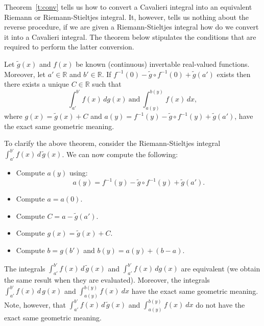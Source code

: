 \documentclass[twoside,reqno,11pt]{fcaa-var} %
\begin{document}
Theorem~\ref{t:conv} tells us how to convert a Cavalieri integral into an equivalent Riemann or Riemann-Stieltjes integral. It, however, tells us nothing about the reverse 
procedure, if we are given a Riemann-Stieltjes integral how do we convert it into a Cavalieri integral. The theorem below stipulates the conditions that are required to perform the latter conversion.

\begin{theorem}
\label{t:reverse}
Let $\widetilde{g}(x)$ and $f(x)$ be known (continuous) invertable real-valued functions. Moreover, let $a'\in \mathbb{R}$ and $b'\in \mathbb{R}$.  If $f^{-1}(0) - \widetilde{g}\circ f^{-1}(0) + \widetilde{g}(a')$ exists then there exists a unique 
$C\in\mathbb{R}$ such that 
\begin{equation}
\int_{a'}^{b'} f(x)\,dg(x)~\textrm{and}~\int_{a(y)}^{b(y)} f(x)\,dx, 
\end{equation}
where $g(x) = \widetilde{g}(x) + C$ and $a(y) = f^{-1}(y)-\widetilde{g}\circ f^{-1}(y) + \widetilde{g}(a')$, have the exact same 
geometric meaning.
\end{theorem}

To clarify the above theorem, consider the Riemann-Stieltjes integral $\int_{a'}^{b'} f(x)\,d\,\widetilde{g}(x)$. We can now compute the following:
\begin{itemize}
 \item Compute $a(y)$ using: 
\begin{equation}
a(y) = f^{-1}(y)-\widetilde{g}\circ f^{-1}(y) + \widetilde{g}(a'). 
\end{equation}
 \item Compute $a = a(0)$.
 \item Compute $C = a - \widetilde{g}(a')$.
 \item Compute $g(x) = \widetilde{g}(x) + C$.
 \item Compute $b = g(b')$ and $b(y) = a(y) + (b-a)$.
\end{itemize}
The integrals $\int_{a'}^{b'} f(x)\,d\,\widetilde{g}(x)$ and $\int_{a'}^{b'} f(x)\,dg(x)$ are equivalent (we obtain the same result when they are evaluated). Moreover, the integrals $\int_{a'}^{b'} f(x)\,d\,g(x)$ and $\int_{a(y)}^{b(y)}f(x)~dx$ have the exact same geometric meaning. Note, however, that
$\int_{a'}^{b'} f(x)\,d\,\widetilde{g}(x)$ and $\int_{a(y)}^{b(y)}f(x)~dx$ do not have the exact same geometric meaning.


\end{document}
